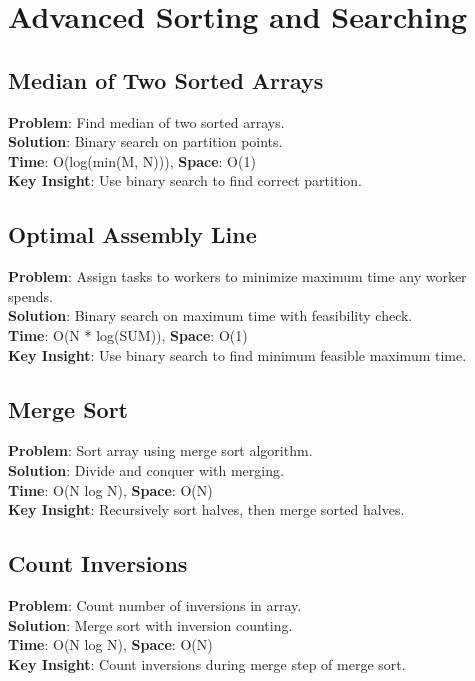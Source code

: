 \documentclass{report}
\begin{document}
\section{Advanced Sorting and Searching}

\subsection{Median of Two Sorted Arrays}
\textbf{Problem}: Find median of two sorted arrays.\\
\textbf{Solution}: Binary search on partition points.\\
\textbf{Time}: O(log(min(M, N))), \textbf{Space}: O(1)\\
\textbf{Key Insight}: Use binary search to find correct partition.

\subsection{Optimal Assembly Line}
\textbf{Problem}: Assign tasks to workers to minimize maximum time any worker spends.\\
\textbf{Solution}: Binary search on maximum time with feasibility check.\\
\textbf{Time}: O(N * log(SUM)), \textbf{Space}: O(1)\\
\textbf{Key Insight}: Use binary search to find minimum feasible maximum time.

\subsection{Merge Sort}
\textbf{Problem}: Sort array using merge sort algorithm.\\
\textbf{Solution}: Divide and conquer with merging.\\
\textbf{Time}: O(N log N), \textbf{Space}: O(N)\\
\textbf{Key Insight}: Recursively sort halves, then merge sorted halves.

\subsection{Count Inversions}
\textbf{Problem}: Count number of inversions in array.\\
\textbf{Solution}: Merge sort with inversion counting.\\
\textbf{Time}: O(N log N), \textbf{Space}: O(N)\\
\textbf{Key Insight}: Count inversions during merge step of merge sort.
\end{document}
